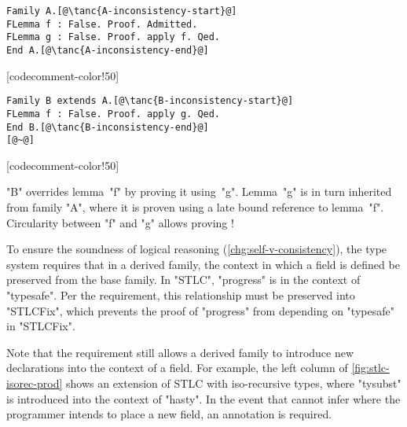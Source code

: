 \begin{centered}
\begin{minipage}{36ex}
\begin{lstlisting}[basicstyle=\fontsize{8.25}{9}\ttfamily]
Family A.[@\tanc{A-inconsistency-start}@]
FLemma f : False. Proof. Admitted.
FLemma g : False. Proof. apply f. Qed.
End A.[@\tanc{A-inconsistency-end}@]
\end{lstlisting}
\end{minipage}
[codecomment-color!50]
\hspace{3.5em}
\begin{minipage}{36ex}
\begin{lstlisting}[basicstyle=\fontsize{8.25}{9}\ttfamily]
Family B extends A.[@\tanc{B-inconsistency-start}@]
FLemma f : False. Proof. apply g. Qed.
End B.[@\tanc{B-inconsistency-end}@]
[@~@]
\end{lstlisting}
\end{minipage}
[codecomment-color!50]
\end{centered}

\noindent
"B" overrides lemma~"f" by proving it using~"g".
Lemma~"g" is in turn inherited from family "A", where it is proven using
a late bound reference to lemma~"f".
Circularity between "f" and "g" allows proving !

To ensure the soundness of logical reasoning (\ref{chg:self-v-consistency}),
the type system requires that in a derived family, the context in which
a field is defined be preserved from the base family.
In "STLC", "progress" is in the context of "typesafe".
Per the requirement, this relationship must be preserved into
"STLCFix", which prevents the proof of "progress" from depending on
"typesafe" in "STLCFix".

Note that the requirement still allows a derived family to introduce
new declarations into the context of a field. %
For example, the left column of \cref{fig:stlc-isorec-prod} shows an
extension of STLC with iso-recursive types, where "tysubst" is
introduced into the context of "hasty".
%
In the event that \Lang cannot infer where the programmer intends to place a new field,
an annotation is required. 




